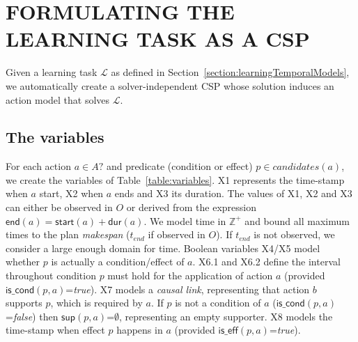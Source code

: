 \documentclass{ecai}
\newcommand{\dur}{\mathsf{dur}}    %
\newcommand{\iscond}{\mathsf{is\_cond}}    %
\newcommand{\iseff}{\mathsf{is\_eff}}    %
\newcommand{\start}{\mathsf{start}}%
\newcommand{\en}{\mathsf{end}}     %
\newcommand{\supp}{\mathsf{sup}}   %
\begin{document}
\section{FORMULATING THE LEARNING TASK AS A CSP}
\label{section:learningAsCSP}


Given a learning task $\mathcal{L}$ as defined in Section~\ref{section:learningTemporalModels}, we automatically create a solver-independent CSP whose solution induces an action model that solves $\mathcal{L}$.


\subsection{The variables}
For each action $a\in A?$ and predicate (condition or effect) $p\in candidates(a)$, we create the variables of Table~\ref{table:variables}. 
X1 represents the time-stamp when $a$ start, X2 when $a$ ends and X3 its duration. The values of X1, X2 and X3 can either be observed in $O$ or derived from the expression $\en(a)=\start(a)+\dur(a)$. We  model time in $\mathbb{Z}^+$ and bound all maximum times to the plan {\em makespan} ($t_{end}$ if observed in $O$). If $t_{end}$ is not observed, we consider a large enough domain for time. 
Boolean variables X4/X5 model whether $p$ is actually a condition/effect of $a$. X6.1 and X6.2 define the interval throughout condition $p$ must hold for the application of action $a$ (provided $\iscond(p,a)$=\textit{true}). X7 models a {\em causal link}, representing that action $b$ supports $p$, which is required by $a$. If $p$ is not a condition of $a$ ($\iscond(p,a)$=\textit{false}) then $\supp(p,a)$=$\emptyset$, representing an empty supporter. X8 models the time-stamp when effect $p$ happens in $a$ (provided $\iseff(p,a)$=\textit{true}).
\end{document}
